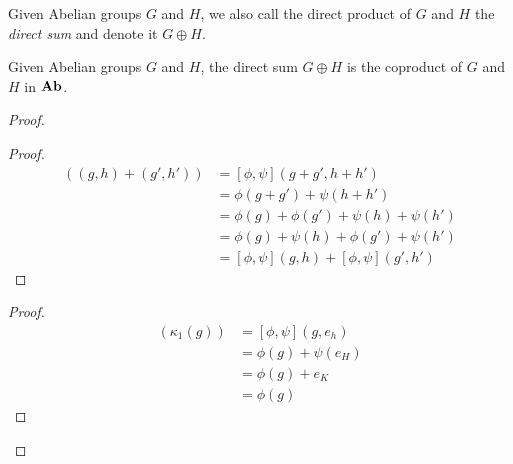 \begin{df}
    Given Abelian groups $G$ and $H$, we also call the direct product of $G$ and $H$ the \emph{direct sum} and denote it $G \oplus H$.
\end{df}

\begin{prop}
    Given Abelian groups $G$ and $H$, the direct sum $G \oplus H$ is the coproduct of $G$ and $H$ in $\mathbf{Ab}$.
\end{prop}

\begin{proof}
    \pf
    \begin{proof}
        \pf
        \begin{align*}
            [\phi,\psi]((g,h) + (g',h')) & = [\phi,\psi](g + g', h + h')             \\
                                         & = \phi(g + g') + \psi(h + h')             \\
                                         & = \phi(g) + \phi(g') + \psi(h) + \psi(h') \\
                                         & = \phi(g) + \psi(h) + \phi(g') + \psi(h') \\
                                         & = [\phi,\psi](g,h) + [\phi,\psi](g',h')
        \end{align*}
    \end{proof}
    \begin{proof}
        \pf
        \begin{align*}
            [\phi,\psi](\kappa_1(g)) & = [\phi,\psi](g,e_h)  \\
                                     & = \phi(g) + \psi(e_H) \\
                                     & = \phi(g) + e_K       \\
                                     & = \phi(g)
        \end{align*}
    \end{proof}

\end{proof}
